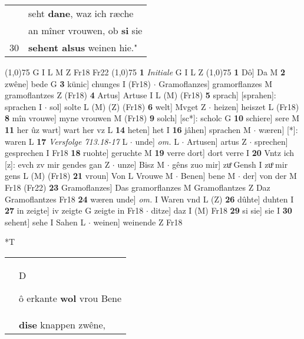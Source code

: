 \documentclass[8pt,a4paper,notitlepage]{article}
\begin{document}
\begin{table}[ht]
\begin{minipage}[t]{0.5\linewidth}
\begin{tabular}{rl}
 & seht \textbf{dane}, waz ich ræche\\ 
 & an mîner vrouwen, ob \textbf{si} sie\\ 
30 & \textbf{sehent alsus} weinen hie."\\ 
\end{tabular}
\scriptsize
\line(1,0){75} \newline
G I L M Z Fr18 Fr22 \newline
\line(1,0){75} \newline
\textbf{1} \textit{Initiale} G I L Z  \newline
\line(1,0){75} \newline
\textbf{1} Dô] Da M \textbf{2} zwêne] bede G \textbf{3} künic] chunges I (Fr18)  $\cdot$ Gramoflanzes] gramorflanzes M gramoflantzes Z (Fr18) \textbf{4} Artus] Artuse I L (M) (Fr18) \textbf{5} sprach] [sprahen]: sprachen I  $\cdot$ sol] solte L (M) (Z) (Fr18) \textbf{6} welt] Mvget Z  $\cdot$ heizen] heiszet L (Fr18) \textbf{8} mîn vrouwe] myne vrouwen M (Fr18) \textbf{9} solch] [sc*]: scholc G \textbf{10} schiere] sere M \textbf{11} her ûz wart] wart her vz L \textbf{14} heten] het I \textbf{16} jâhen] sprachen M  $\cdot$ wæren] [*]: waren L \textbf{17} \textit{Versfolge 713.18-17} L   $\cdot$ unde] \textit{om.} L  $\cdot$ Artusen] artus Z  $\cdot$ sprechen] gesprechen I Fr18 \textbf{18} ruohte] geruchte M \textbf{19} verre dort] dort verre I \textbf{20} Vntz ich [z]: evch zv mir gendes gan Z  $\cdot$ unze] Bisz M  $\cdot$ gêns zuo mir] zuͤ Gensh I zuͦ mir gens L (M) (Fr18) \textbf{21} vroun] Von L Vrouwe M  $\cdot$ Benen] bene M  $\cdot$ der] von der M Fr18 (Fr22) \textbf{23} Gramoflanzes] Das gramorflanzes M Gramoflantzes Z Daz Gramoflantzes Fr18 \textbf{24} wæren unde] \textit{om.} I Waren vnd L (Z) \textbf{26} dûhte] duhten I \textbf{27} in zeigte] iv zeigte G zeigte in Fr18  $\cdot$ ditze] daz I (M) Fr18 \textbf{29} si sie] sie I \textbf{30} sehent] sehe I Sahen L  $\cdot$ weinen] weinende Z Fr18 \newline
\end{minipage}
\hspace{0.5cm}
\begin{minipage}[t]{0.5\linewidth}
\small
\begin{center}*T
\end{center}
\begin{tabular}{rl}
 & \begin{large}D\end{large}ô erkante \textbf{wol} vrou Bene\\ 
 & \textbf{dise} knappen zwêne,\\ 

\end{tabular}
\end{minipage}
\end{table}
\end{document}

